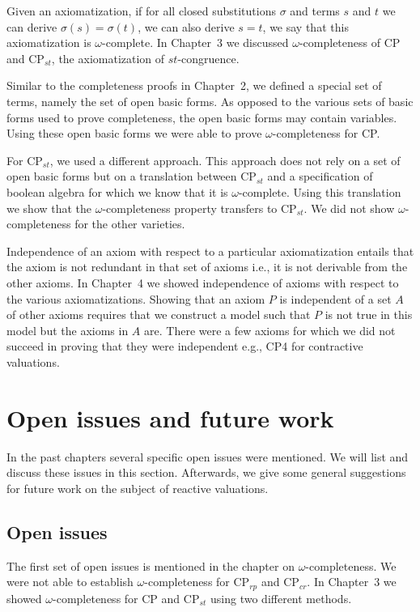 \documentclass[a4paper,twoside,openright]{report}
\begin{document}
Given an axiomatization, if for all closed substitutions $\sigma$ and terms $s$ and $t$ we can derive $\sigma(s)=\sigma(t)$, we can also derive $s=t$, we say that this axiomatization is $\omega$-complete. In Chapter~3 we discussed $\omega$-completeness of CP and $\text{CP}_{st}$, the axiomatization of $st$-congruence.

Similar to the completeness proofs in Chapter~2, we defined a special set of terms, namely the set of open basic forms. As opposed to the various sets of basic forms used to prove completeness, the open basic forms may contain variables. Using these open basic forms we were able to prove $\omega$-completeness for CP.

For $\text{CP}_{st}$, we used a different approach. This approach does not rely on a set of open basic forms but on a translation between $\text{CP}_{st}$ and a specification of boolean algebra for which we know that it is $\omega$-complete. Using this translation we show that the $\omega$-completeness property transfers to $\text{CP}_{st}$. We did not show $\omega$-completeness for the other varieties.

Independence of an axiom with respect to a particular axiomatization entails that the axiom is not redundant in that set of axioms i.e., it is not derivable from the other axioms. In Chapter~4 we showed independence of axioms with respect to the various axiomatizations. Showing that an axiom $P$ is independent of a set $A$ of other axioms requires that we construct a model such that $P$ is not true in this model but the axioms in $A$ are. There were a few axioms for which we did not succeed in proving that they were independent e.g., CP4 for contractive valuations.

\section{Open issues and future work}
In the past chapters several specific open issues were mentioned. We will list and discuss these issues in this section. Afterwards, we give some general suggestions for future work on the subject of reactive valuations.

\subsection{Open issues}

The first set of open issues is mentioned in the chapter on $\omega$-completeness. We were not able to establish $\omega$-completeness for $\text{CP}_{rp}$ and $\text{CP}_{cr}$. In Chapter~3 we showed $\omega$-completeness for CP and $\text{CP}_{st}$ using two different methods.
\end{document}
